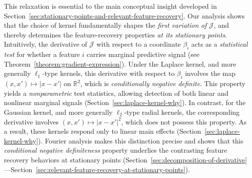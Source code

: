 \documentclass[sn-mathphys-num]{sn-jnl}%
\numberwithin{equation}{section}
\theoremstyle{thmstyleone}%
\theoremstyle{thmstyletwo}%
\theoremstyle{thmstylethree}%
\begin{document}
{This relaxation is essential to the main conceptual insight developed in Section~\ref{sec:stationary-points-and-relevant-feature-recovery}. Our analysis shows that the choice of kernel fundamentally shapes the \emph{first variation of $\mathcal{J}$}, and thereby determines the feature-recovery properties \emph{at its stationary points}. Intuitively, the derivative of $\mathcal{J}$ with respect to a coordinate $\beta_i$ acts as a \emph{statistical test} for whether a feature $i$ carries marginal predictive signal (see Theorem~\ref{theorem:gradient-expression}). Under the Laplace kernel, and more generally $\ell_1$-type kernels, this derivative with respect to $\beta_i$ involves the map $(x,x') \mapsto |x-x'|$ on $\mathbb{R}^2$, which is \emph{conditionally negative definite}. This property yields a \emph{nonparametric} test statistics, allowing detection of both linear and nonlinear marginal signals (Section~\ref{sec:laplace-kernel-why}). In contrast, for the Gaussian kernel, and more generally $\ell_2$-type radial kernels, the corresponding derivative involves $(x,x') \mapsto |x-x'|^2$, which does not possess this property. As a result, these kernels respond only to linear main effects (Section~\ref{sec:laplace-kernel-why}). Fourier analysis makes this distinction precise and shows that this \emph{conditional negative definiteness} property underlies the contrasting feature recovery behaviors at stationary points (Section~\ref{sec:decomposition-of-derivative}---Section~\ref{sec:relevant-feature-recovery-at-stationary-points}).



}
\end{document}
